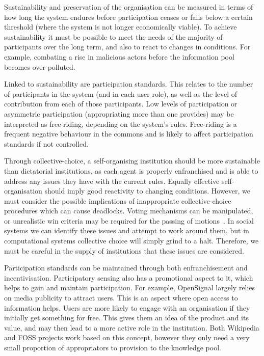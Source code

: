 Sustainability and preservation of the organisation can be measured in terms of how long the system endures before participation ceases or falls below a certain threshold (where the system is not longer economically viable). 
To achieve sustainability it must be possible to meet the needs of the majority of participants over the long term, and also to react to changes in conditions. 
For example, combating a rise in malicious actors before the information pool becomes over-polluted. 

Linked to sustainability are participation standards. 
This relates to the number of participants in the system (and in each user role), as well as the level of contribution from each of those participants. Low levels of participation or asymmetric participation (\eg appropriating more than one provides) may be interpreted as free-riding, depending on the system's rules. 
Free-riding is a frequent negative behaviour in the commons and is likely to affect participation standards if not controlled.

Through collective-choice, a self-organising institution should be more sustainable than dictatorial institutions, as each agent is properly enfranchised and is able to address any issues they have with the current rules. 
Equally effective self-organisation should imply good reactivity to changing conditions. 
However, we must consider the possible implications of inappropriate collective-choice procedures which can cause deadlocks. 
Voting mechanisms can be manipulated, or unrealistic win criteria may be required for the passing of motions~\citep{Pitt2011b}. 
In social systems we can identify these issues and attempt to work around them, but in computational systems collective choice will simply grind to a halt. 
Therefore, we must be careful in the supply of institutions that these issues are considered.

Participation standards can be maintained through both enfranchisement and incentivisation. 
Participatory sensing also has a promotional aspect to it, which helps to gain and maintain participation. 
For example, OpenSignal largely relies on media publicity to attract users. 
This is an aspect where open access to information helps. 
Users are more likely to engage with an organisation if they initially get something for free. 
This gives them an idea of the product and its value, and may then lead to a more active role in the institution. 
Both Wikipedia and \ac{FOSS} projects work based on this concept, however they only need a very small proportion of appropriators to provision to the knowledge pool. 


